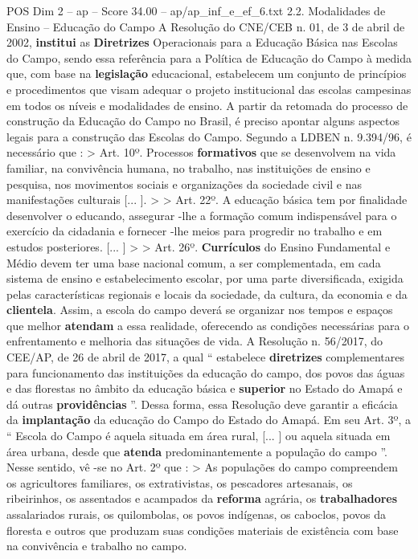 \begin{textsample}{POS Dim 2 – ap – Score 34.00 – ap/ap\_inf\_e\_ef\_6.txt}  \label{ex:f2_pos_141}
2.2.
Modalidades de Ensino – Educação do Campo A Resolução do CNE/CEB n. 01, de 3 de abril de 2002, \textbf{institui} as \textbf{Diretrizes} Operacionais para a Educação Básica nas Escolas do Campo, sendo essa referência para a Política de Educação do Campo à medida que, com base na \textbf{legislação} educacional, estabelecem um conjunto de princípios e procedimentos que visam adequar o projeto institucional das escolas campesinas em todos os níveis e modalidades de ensino.
A partir da retomada do processo de construção da Educação do Campo no Brasil, é preciso apontar alguns aspectos legais para a construção das Escolas do Campo.
Segundo a LDBEN n. 9.394/96, é necessário que : > Art. 10º.
Processos \textbf{formativos} que se desenvolvem na vida familiar, na convivência humana, no trabalho, nas instituições de ensino e pesquisa, nos movimentos sociais e organizações da sociedade civil e nas manifestações culturais [... ]. > > Art. 22º.
A educação básica tem por finalidade desenvolver o educando, assegurar -lhe a formação comum indispensável para o exercício da cidadania e fornecer -lhe meios para progredir no trabalho e em estudos posteriores. [... ] > > Art. 26º. \textbf{Currículos} do Ensino Fundamental e Médio devem ter uma base nacional comum, a ser complementada, em cada sistema de ensino e estabelecimento escolar, por uma parte diversificada, exigida pelas características regionais e locais da sociedade, da cultura, da economia e da \textbf{clientela}.
Assim, a escola do campo deverá se organizar nos tempos e espaços que melhor \textbf{atendam} a essa realidade, oferecendo as condições necessárias para o enfrentamento e melhoria das situações de vida.
A Resolução n. 56/2017, do CEE/AP, de 26 de abril de 2017, a qual “ estabelece \textbf{diretrizes} complementares para funcionamento das instituições da educação do campo, dos povos das águas e das florestas no âmbito da educação básica e \textbf{superior} no Estado do Amapá e dá outras \textbf{providências} ”.
Dessa forma, essa Resolução deve garantir a eficácia da \textbf{implantação} da educação do Campo do Estado do Amapá.
Em seu Art. 3º, a “ Escola do Campo é aquela situada em área rural, [... ] ou aquela situada em área urbana, desde que \textbf{atenda} predominantemente a população do campo ”.
Nesse sentido, vê -se no Art. 2º que : > As populações do campo compreendem os agricultores familiares, os extrativistas, os pescadores artesanais, os ribeirinhos, os assentados e acampados da \textbf{reforma} agrária, os \textbf{trabalhadores} assalariados rurais, os quilombolas, os povos indígenas, os caboclos, povos da floresta e outros que produzam suas condições materiais de existência com base na convivência e trabalho no campo.

\end{textsample}
